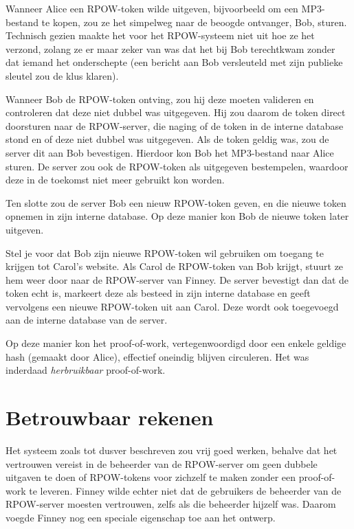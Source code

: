 \documentclass[smalldemyvopaper,11pt,twoside,onecolumn,openright,extrafontsizes,hidelinks]{memoir}
\begin{document}
Wanneer Alice een RPOW-token wilde uitgeven, bijvoorbeeld om een
MP3-bestand te kopen, zou ze het simpelweg naar de beoogde ontvanger,
Bob, sturen. Technisch gezien maakte het voor het RPOW-systeem niet uit
hoe ze het verzond, zolang ze er maar zeker van was dat het bij Bob
terechtkwam zonder dat iemand het onderschepte (een bericht aan Bob
versleuteld met zijn publieke sleutel zou de klus klaren).

Wanneer Bob de RPOW-token ontving, zou hij deze moeten valideren en
controleren dat deze niet dubbel was uitgegeven. Hij zou daarom de token
direct doorsturen naar de RPOW-server, die naging of de token in de
interne database stond en of deze niet dubbel was uitgegeven. Als de
token geldig was, zou de server dit aan Bob bevestigen. Hierdoor kon Bob
het MP3-bestand naar Alice sturen. De server zou ook de RPOW-token als
uitgegeven bestempelen, waardoor deze in de toekomst niet meer gebruikt
kon worden.

Ten slotte zou de server Bob een nieuw RPOW-token geven, en die nieuwe
token opnemen in zijn interne database. Op deze manier kon Bob de nieuwe
token later uitgeven.

Stel je voor dat Bob zijn nieuwe RPOW-token wil gebruiken om toegang te
krijgen tot Carol's website. Als Carol de RPOW-token van Bob krijgt,
stuurt ze hem weer door naar de RPOW-server van Finney. De server
bevestigt dan dat de token echt is, markeert deze als besteed in zijn
interne database en geeft vervolgens een nieuwe RPOW-token uit aan
Carol. Deze wordt ook toegevoegd aan de interne database van de server.

Op deze manier kon het proof-of-work, vertegenwoordigd door een enkele
geldige hash (gemaakt door Alice), effectief oneindig blijven
circuleren. Het was inderdaad \emph{herbruikbaar} proof-of-work.

\section{Betrouwbaar rekenen}\label{betrouwbaar-rekenen}

Het systeem zoals tot dusver beschreven zou vrij goed werken, behalve
dat het vertrouwen vereist in de beheerder van de RPOW-server om geen
dubbele uitgaven te doen of RPOW-tokens voor zichzelf te maken zonder
een proof-of-work te leveren. Finney wilde echter niet dat de gebruikers
de beheerder van de RPOW-server moesten vertrouwen, zelfs als die
beheerder hijzelf was. Daarom voegde Finney nog een speciale eigenschap
toe aan het ontwerp.
\end{document}
